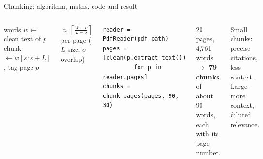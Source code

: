 \documentclass[aspectratio=169,11pt]{beamer}
\begin{document}
\begin{frame}[fragile]{Chunking: algorithm, maths, code and result}
\begin{columns}[T]
\begin{balgo}
\begin{algorithmic}[1]
  \State words $w\gets$ clean text of $p$
    \State chunk $\gets w[s:s+L]$, tag page $p$
  \EndFor
\EndFor
\end{algorithmic}
\end{balgo}
\begin{bmath}
$\approx\left\lceil\frac{W-o}{L-o}\right\rceil$ per page ($L$ size, $o$ overlap)
\end{bmath}
\begin{bcode}
\begin{lstlisting}
reader = PdfReader(pdf_path)
pages = [clean(p.extract_text())
         for p in reader.pages]
chunks = chunk_pages(pages, 90, 30)
\end{lstlisting}
\end{bcode}
\begin{bres}
20 pages, 4,761 words $\rightarrow$ \textbf{79 chunks} of about 90 words, each with its page number.
\end{bres}
\begin{bex}
Small chunks: precise citations, less context. Large: more context, diluted relevance.
\end{bex}
\end{columns}
\end{frame}

\end{document}
